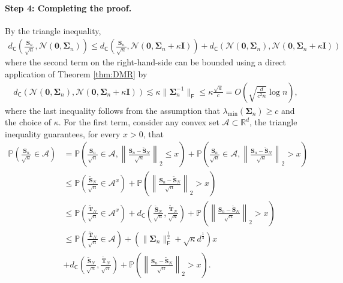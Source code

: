 \paragraph{Step 4: Completing the proof.} By the triangle inequality,
\begin{align}\label{eq:Wu-initial-decompose}
d_{\mathsf{C}}\left(\frac{\bm{S}_n}{\sqrt{n}},\mathcal{N}(\bm{0},\bm{\Sigma}_n)\right) \leq d_{\mathsf{C}}\left(\frac{\bm{S}_n}{\sqrt{n}},\mathcal{N}(\bm{0},\bm{\Sigma}_n + \kappa \bm{I})\right) + d_{\mathsf{C}}\left(\mathcal{N}(\bm{0},\bm{\Sigma}_n),\mathcal{N}(\bm{0},\bm{\Sigma}_n + \kappa \bm{I})\right)
\end{align}
where the second term on the right-hand-side can be bounded using a direct application of Theorem \ref{thm:DMR} by
\begin{align}\label{eq:Wu-Gaussian-comparison}
d_{\mathsf{C}}\left(\mathcal{N}(\bm{0},\bm{\Sigma}_n),\mathcal{N}(\bm{0},\bm{\Sigma}_n + \kappa \bm{I})\right) \lesssim \kappa \|\bm{\Sigma}_n^{-1}\|_{\mathsf{F}} \leq \kappa \frac{\sqrt{d}}{c}  = O\left( \sqrt{\frac{d}{c^2 n}} \log n \right),
\end{align}
where the last inequality follows from the assumption that $\lambda_{\min}(\bm{\Sigma}_n) \geq c$ and the choice of $\kappa$.
For the first term, consider any convex set $\mathcal{A} \subset \mathbb{R}^d$, the triangle inequality guarantees, for every $x > 0$, that
\begin{align}\label{eq:Wu-decompose-upper}
\mathbb{P}\left(\frac{\bm{S}_n}{\sqrt{n}} \in \mathcal{A}\right)&= \mathbb{P}\left(\frac{\bm{S}_n}{\sqrt{n}} \in \mathcal{A}, \left\|\frac{\bm{S}_n - \tilde{\bm{S}}_N}{\sqrt{n}}\right\|_2 \leq x\right) + \mathbb{P}\left(\frac{\bm{S}_n}{\sqrt{n}} \in \mathcal{A}, \left\|\frac{\bm{S}_n - \tilde{\bm{S}}_N}{\sqrt{n}}\right\|_2 > x\right) \nonumber \\ 
&\leq \mathbb{P}\left(\frac{\tilde{\bm{S}}_N}{\sqrt{n}} \in \mathcal{A}^x \right) + \mathbb{P}\left(\left\|\frac{\bm{S}_n - \tilde{\bm{S}}_N}{\sqrt{n}}\right\|_2 > x\right)\nonumber \\
&\leq \mathbb{P}\left(\frac{\tilde{\bm{T}}_N}{\sqrt{n}} \in \mathcal{A}^x \right) + d_{\mathsf{C}}\left(\frac{\tilde{\bm{S}}_N}{\sqrt{n}},\frac{\tilde{\bm{T}}_N}{\sqrt{n}}\right)+ \mathbb{P}\left(\left\|\frac{\bm{S}_n - \tilde{\bm{S}}_N}{\sqrt{n}}\right\|_2 > x\right) \nonumber \\ 
&\leq \mathbb{P}\left(\frac{\tilde{\bm{T}}_N}{\sqrt{n}} \in \mathcal{A} \right) + \left(\|\bm{\Sigma}_n\|_{\mathsf{F}}^{\frac{1}{2}} + \sqrt{\kappa} d^{\frac{1}{4}}\right) x \nonumber \\ 
&+ d_{\mathsf{C}}\left(\frac{\tilde{\bm{S}}_N}{\sqrt{n}},\frac{\tilde{\bm{T}}_N}{\sqrt{n}}\right)+ \mathbb{P}\left(\left\|\frac{\bm{S}_n - \tilde{\bm{S}}_N}{\sqrt{n}}\right\|_2 > x\right).
\end{align}

